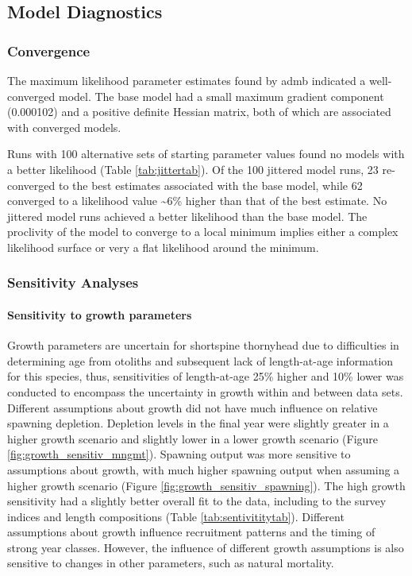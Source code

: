 \documentclass[11pt,
  english,
  letterpaper,
]{article}
\begin{document}
\hypertarget{model-diagnostics}{%
\subsection{Model Diagnostics}\label{model-diagnostics}}

\hypertarget{convergence}{%
\subsubsection{Convergence}\label{convergence}}

The maximum likelihood parameter estimates found by \gls{admb} indicated a well-converged model. The base model had a small maximum gradient component (0.000102) and a positive definite Hessian matrix, both of which are associated with converged models.

Runs with 100 alternative sets of starting parameter values found no models with a better likelihood (Table \ref{tab:jittertab}). Of the 100 jittered model runs, 23 re-converged to the best estimates associated with the base model, while 62 converged to a likelihood value \textasciitilde6\% higher than that of the best estimate. No jittered model runs achieved a better likelihood than the base model. The proclivity of the model to converge to a local minimum implies either a complex likelihood surface or very a flat likelihood around the minimum.

\hypertarget{sensitivity-analyses}{%
\subsubsection{Sensitivity Analyses}\label{sensitivity-analyses}}

\hypertarget{sensitivity-to-growth-parameters}{%
\paragraph{Sensitivity to growth parameters}\label{sensitivity-to-growth-parameters}}

Growth parameters are uncertain for shortspine thornyhead due to difficulties in determining age from otoliths and subsequent lack of length-at-age information for this species, thus, sensitivities of length-at-age 25\% higher and 10\% lower was conducted to encompass the uncertainty in growth within and between data sets. Different assumptions about growth did not have much influence on relative spawning depletion. Depletion levels in the final year were slightly greater in a higher growth scenario and slightly lower in a lower growth scenario (Figure \ref{fig:growth_sensitiv_mngmt}). Spawning output was more sensitive to assumptions about growth, with much higher spawning output when assuming a higher growth scenario (Figure \ref{fig:growth_sensitiv_spawning}). The high growth sensitivity had a slightly better overall fit to the data, including to the survey indices and length compositions (Table \ref{tab:sentivititytab}). Different assumptions about growth influence recruitment patterns and the timing of strong year classes. However, the influence of different growth assumptions is also sensitive to changes in other parameters, such as natural mortality.
\end{document}
